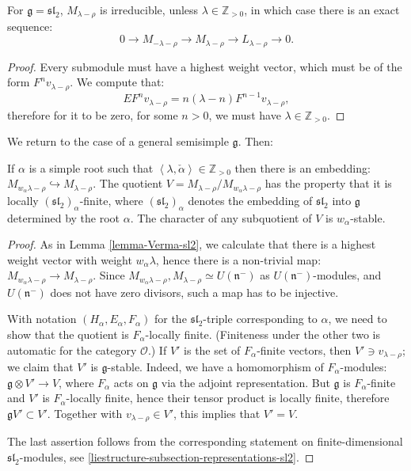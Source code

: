 \begin{lemma}
\label{lemma-Verma-sl2}
For $\mathfrak g = \mathfrak{sl}_2$, $M_{\lambda-\rho}$ is irreducible, unless $\lambda \in \mathbb Z_{>0}$, in which case there is an exact sequence:
$$ 0 \to M_{-\lambda-\rho}\to M_{\lambda-\rho} \to L_{\lambda-\rho} \to 0.$$
\end{lemma}

\begin{proof}
 Every submodule must have a highest weight vector, which must be of the form $F^nv_{\lambda-\rho}$. We compute that:
$$ EF^n v_{\lambda-\rho} = n (\lambda-n) F^{n-1} v_{\lambda-\rho},$$
therefore for it to be zero, for some $n>0$, we must have $\lambda\in \mathbb Z_{>0}$.
\end{proof}

We return to the case of a general semisimple $\mathfrak g$. Then:

\begin{proposition}
\label{proposition-sa-quotient}
 If $\alpha$ is a simple root such that $\left< \lambda,\check\alpha\right>\in \mathbb Z_{>0}$ then there is an embedding: $M_{w_\alpha\lambda-\rho}\hookrightarrow M_{\lambda-\rho}$. The quotient $V=M_{\lambda-\rho}/M_{w_\alpha\lambda-\rho}$ has the property that it is locally $(\mathfrak{sl}_2)_\alpha$-finite, where $(\mathfrak{sl}_2)_\alpha$ denotes the embedding of $\mathfrak{sl}_2$ into $\mathfrak g$ determined by the root $\alpha$. The character of any subquotient of $V$ is $w_\alpha$-stable.
\end{proposition}

\begin{proof}
 As in Lemma \ref{lemma-Verma-sl2}, we calculate that there is a highest weight vector with weight $w_\alpha\lambda$, hence there is a non-trivial map: $M_{w_\alpha\lambda-\rho}\to M_{\lambda-\rho}$. Since $M_{w_\alpha\lambda-\rho}, M_{\lambda-\rho} \simeq U(\mathfrak n^-)$ as $U(\mathfrak n^-)$-modules, and $U(\mathfrak n^-)$ does not have zero divisors, such a map has to be injective.

 With notation $(H_\alpha,E_\alpha,F_\alpha)$ for the $\mathfrak{sl}_2$-triple corresponding to $\alpha$, we need to show that the quotient is $F_\alpha$-locally finite. (Finiteness under the other two is automatic for the category $\mathcal O$.) If $V'$ is the set of $F_\alpha$-finite vectors, then $V'\ni v_{\lambda-\rho}$; we claim that $V'$ is $\mathfrak g$-stable. Indeed, we have a homomorphism of $F_\alpha$-modules: $\mathfrak g\otimes V'\to V$, where $F_\alpha$ acts on $\mathfrak g$ via the adjoint representation. But $\mathfrak g$ is $F_\alpha$-finite and $V'$ is $F_\alpha$-locally finite, hence their tensor product is locally finite, therefore $\mathfrak gV'\subset V'$. Together with $v_{\lambda-\rho}\in V'$, this implies that $V'=V$.
 
 The last assertion follows from the corresponding statement on finite-dimensional $\mathfrak{sl}_2$-modules, see \ref{liestructure-subsection-representations-sl2}.
\end{proof}

